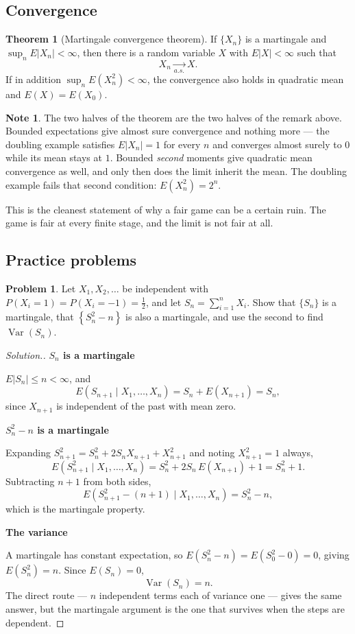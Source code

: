 \documentclass[11pt,a4paper]{article}
\theoremstyle{definition}
\newtheorem{thm}{Theorem}[subsection]
\newtheorem*{note}{Note}
\newtheorem{problemx}{Problem}[subsection]
\newenvironment{problem}{\begin{problemx}}{\end{problemx}}
\newenvironment{solution}
  {\renewcommand{\qedsymbol}{}\begin{proof}[\textit{Solution}.]}
  {\end{proof}}
\newcommand{\subhead}[1]{%
  \par\medskip\noindent\textbf{#1}\par\nobreak\smallskip}
\DeclareMathOperator{\Var}{Var}
\begin{document}
\subsection{Convergence}

\begin{thm}[Martingale convergence theorem]
If $\{X_n\}$ is a martingale and $\sup_n E\left|X_n\right| < \infty$, then
there is a random variable $X$ with $E\left|X\right|<\infty$ such that
$$X_n \underset{a.s.}{\longrightarrow} X .$$
If in addition $\sup_n E\left(X_n^{2}\right)<\infty$, the convergence also holds
in quadratic mean and $E(X) = E(X_0)$.
\end{thm}

\begin{note}
The two halves of the theorem are the two halves of the remark above. Bounded
expectations give almost sure convergence and nothing more --- the doubling
example satisfies $E\left|X_n\right|=1$ for every $n$ and converges almost
surely to $0$ while its mean stays at $1$. Bounded \emph{second} moments give
quadratic mean convergence as well, and only then does the limit inherit the
mean. The doubling example fails that second condition:
$E\left(X_n^{2}\right)=2^{n}$.

This is the cleanest statement of why a fair game can be a certain ruin. The
game is fair at every finite stage, and the limit is not fair at all.
\end{note}

\subsection{Practice problems}

\begin{problem}
Let $X_1, X_2, \dots$ be independent with $P\left(X_i=1\right)=P\left(X_i=-1\right)=\tfrac12$,
and let $S_n = \sum_{i=1}^{n}X_i$. Show that $\{S_n\}$ is a martingale, that
$\left\{S_n^{2}-n\right\}$ is also a martingale, and use the second to find
$\Var(S_n)$.
\end{problem}
\begin{solution}
\subhead{$S_n$ is a martingale}
$E\left|S_n\right|\leq n<\infty$, and
$$E\left(S_{n+1}\mid X_1,\dots,X_n\right) = S_n + E\left(X_{n+1}\right) = S_n ,$$
since $X_{n+1}$ is independent of the past with mean zero.

\subhead{$S_n^{2}-n$ is a martingale}
Expanding $S_{n+1}^{2} = S_n^{2} + 2S_nX_{n+1} + X_{n+1}^{2}$ and noting
$X_{n+1}^{2}=1$ always,
$$E\left(S_{n+1}^{2}\mid X_1,\dots,X_n\right)
= S_n^{2} + 2S_n\,E\left(X_{n+1}\right) + 1 = S_n^{2}+1 .$$
Subtracting $n+1$ from both sides,
$$E\left(S_{n+1}^{2}-(n+1)\mid X_1,\dots,X_n\right) = S_n^{2}-n ,$$
which is the martingale property.

\subhead{The variance}
A martingale has constant expectation, so
$E\left(S_n^{2}-n\right) = E\left(S_0^{2}-0\right) = 0$, giving
$E\left(S_n^{2}\right) = n$. Since $E(S_n)=0$,
$$\Var(S_n) = n .$$
The direct route --- $n$ independent terms each of variance one --- gives the
same answer, but the martingale argument is the one that survives when the steps
are dependent.
\end{solution}
\end{document}
